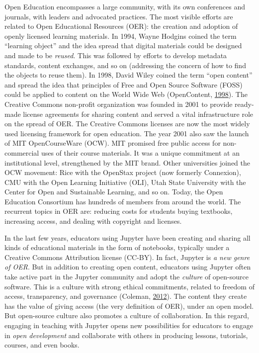 \documentclass[]{book}
\begin{document}
Open Education encompasses a large community, with its own conferences
and journals, with leaders and advocated practices. The most visible
efforts are related to Open Educational Resources (OER): the creation
and adoption of openly licensed learning materials. In 1994, Wayne
Hodgins coined the term ``learning object'' and the idea spread that
digital materials could be designed and made to be \emph{reused}. This was
followed by efforts to develop metadata standards, content exchanges,
and so on (addressing the concern of how to find the objects to reuse
them). In 1998, David Wiley coined the term ``open content'' and spread
the idea that principles of Free and Open Source Software (FOSS) could
be applied to content on the World Wide Web (OpenContent, \protect\hyperlink{ref-OC1998}{1998}). The Creative Commons
non-profit organization was founded in 2001 to provide ready-made
license agreements for sharing content and served a vital
infrastructure role on the spread of OER. The Creative Commons
licenses are now the most widely used licensing framework for open
education. The year 2001 also saw the launch of MIT OpenCourseWare
(OCW). MIT promised free public access for non-commercial uses of
their course materials. It was a unique commitment at an institutional
level, strengthened by the MIT brand. Other universities joined the
OCW movement: Rice with the OpenStax project (now formerly Connexion),
CMU with the Open Learning Initiative (OLI), Utah State University
with the Center for Open and Sustainable Learning, and so on. Today,
the Open Education Consortium has hundreds of members from around the
world. The recurrent topics in OER are: reducing costs for students
buying textbooks, increasing access, and dealing with copyright and
licenses.

In the last few years, educators using Jupyter have been creating and
sharing all kinds of educational materials in the form of notebooks,
typically under a Creative Commons Attribution license (CC-BY). In
fact, Jupyter is \emph{a new genre of OER}. But in addition to creating
open content, educators using Jupyter often take active part in the
Jupyter community and adopt the \emph{culture} of open-source
software. This is a culture with strong ethical commitments, related
to freedom of access, transparency, and governance (Coleman, \protect\hyperlink{ref-coleman2012coding}{2012}).
The content they create has the value of giving access (the
very definition of OER), under an open model. But open-source culture
also promotes a culture of collaboration. In this regard, engaging in
teaching with Jupyter opens new possibilities for educators to engage
in \emph{open development} and collaborate with others in producing
lessons, tutorials, courses, and even books.
\end{document}
